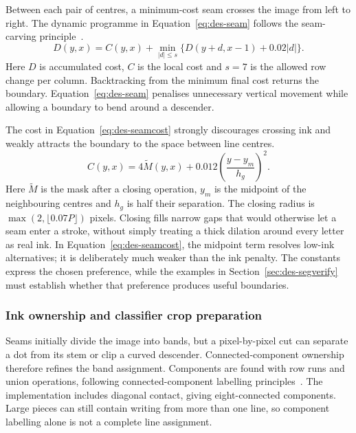 Between each pair of centres, a minimum-cost seam crosses the image from left to right. The dynamic programme in Equation~\ref{eq:des-seam} follows the seam-carving principle~\cite[PDF p.~3, Sec.~3]{avidan2007}.
\begin{equation}
D(y,x)=C(y,x)+\min_{|d|\leq s}
\{D(y+d,x-1)+0.02|d|\}.
\label{eq:des-seam}
\end{equation}
Here $D$ is accumulated cost, $C$ is the local cost and $s=7$ is the allowed row change per column. Backtracking from the minimum final cost returns the boundary. Equation~\ref{eq:des-seam} penalises unnecessary vertical movement while allowing a boundary to bend around a descender.

The cost in Equation~\ref{eq:des-seamcost} strongly discourages crossing ink and weakly attracts the boundary to the space between line centres.
\begin{equation}
C(y,x)=4\widetilde M(y,x)
+0.012\left(\frac{y-y_m}{h_g}\right)^2.
\label{eq:des-seamcost}
\end{equation}
Here $\widetilde M$ is the mask after a closing operation, $y_m$ is the midpoint of the neighbouring centres and $h_g$ is half their separation. The closing radius is $\max(2,\lfloor0.07P\rfloor)$ pixels. Closing fills narrow gaps that would otherwise let a seam enter a stroke, without simply treating a thick dilation around every letter as real ink. In Equation~\ref{eq:des-seamcost}, the midpoint term resolves low-ink alternatives; it is deliberately much weaker than the ink penalty. The constants express the chosen preference, while the examples in Section~\ref{sec:des-segverify} must establish whether that preference produces useful boundaries.

\subsubsection{Ink ownership and classifier crop preparation}
Seams initially divide the image into bands, but a pixel-by-pixel cut can separate a dot from its stem or clip a curved descender. Connected-component ownership therefore refines the band assignment. Components are found with row runs and union operations, following connected-component labelling principles~\cite[pp.~476--479]{rosenfeld1966}. The implementation includes diagonal contact, giving eight-connected components. Large pieces can still contain writing from more than one line, so component labelling alone is not a complete line assignment.

